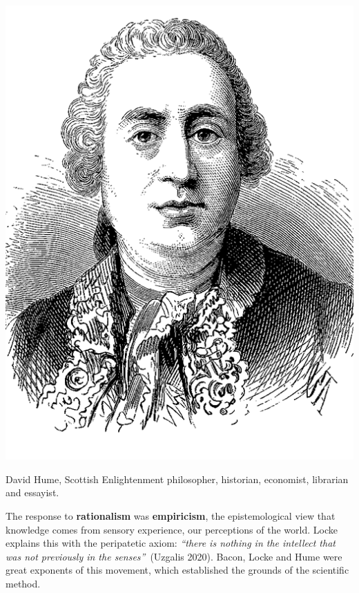 \documentclass[
  letterpaper,
  12pt,
  british]{tufte-book}
\theoremstyle{plain}
\theoremstyle{plain}
\theoremstyle{definition}
\theoremstyle{remark}
\begin{document}
\begin{marginfigure}

{\centering \includegraphics{Images/hume.png}

}

\end{marginfigure}

David Hume, Scottish Enlightenment philosopher, historian, economist,
librarian and essayist.

The response to \textbf{rationalism} was \textbf{empiricism}, the
epistemological view that knowledge comes from sensory experience, our
perceptions of the world. Locke explains this with the peripatetic
axiom: \emph{``there is nothing in the intellect that was not
previously in the senses''}~(Uzgalis
2020).
Bacon, Locke and Hume were great exponents of this movement, which
established the grounds of the scientific method.
\end{document}
